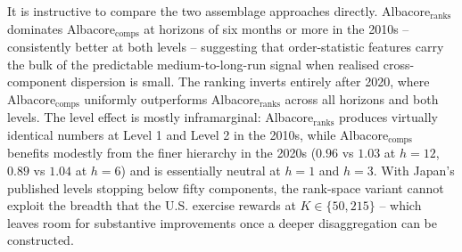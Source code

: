 It is instructive to compare the two assemblage approaches directly. Albacore$_{\text{ranks}}$ dominates Albacore$_{\text{comps}}$ at horizons of six months or more in the 2010s -- consistently better at both levels -- suggesting that order-statistic features carry the bulk of the predictable medium-to-long-run signal when realised cross-component dispersion is small. The ranking inverts entirely after 2020, where Albacore$_{\text{comps}}$ uniformly outperforms Albacore$_{\text{ranks}}$ across all horizons and both levels. The level effect is mostly inframarginal: Albacore$_{\text{ranks}}$ produces virtually identical numbers at Level 1 and Level 2 in the 2010s, while Albacore$_{\text{comps}}$ benefits modestly from the finer hierarchy in the 2020s ($0.96$ vs $1.03$ at $h=12$, $0.89$ vs $1.04$ at $h=6$) and is essentially neutral at $h=1$ and $h=3$. With Japan's published levels stopping below fifty components, the rank-space variant cannot exploit the breadth that the U.S. exercise rewards at $K \in \{50, 215\}$ -- which leaves room for substantive improvements once a deeper disaggregation can be constructed.


